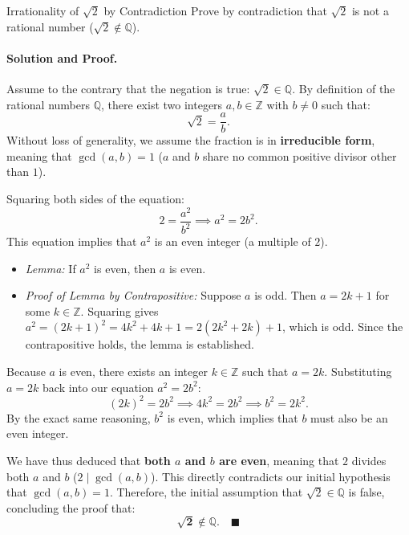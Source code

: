 \begin{workedexample}{Irrationality of $\sqrt{2}$ by Contradiction}
Prove by contradiction that $\sqrt{2}$ is not a rational number ($\sqrt{2} \notin \mathbb{Q}$).

\paragraph{Solution and Proof.}
Assume to the contrary that the negation is true: $\sqrt{2} \in \mathbb{Q}$.
By definition of the rational numbers $\mathbb{Q}$, there exist two integers $a, b \in \mathbb{Z}$ with $b \neq 0$ such that:
\[
\sqrt{2} = \frac{a}{b}.
\]
Without loss of generality, we assume the fraction is in \textbf{irreducible form}, meaning that $\gcd(a, b) = 1$ ($a$ and $b$ share no common positive divisor other than $1$).

Squaring both sides of the equation:
\[
2 = \frac{a^2}{b^2} \implies a^2 = 2 b^2.
\]
This equation implies that $a^2$ is an even integer (a multiple of $2$).
\begin{itemize}[leftmargin=1.4em,itemsep=2pt]
  \item \textit{Lemma:} If $a^2$ is even, then $a$ is even.
  \item \textit{Proof of Lemma by Contrapositive:} Suppose $a$ is odd. Then $a = 2k + 1$ for some $k \in \mathbb{Z}$.
  Squaring gives $a^2 = (2k+1)^2 = 4k^2 + 4k + 1 = 2(2k^2 + 2k) + 1$, which is odd. Since the contrapositive holds, the lemma is established.
\end{itemize}
Because $a$ is even, there exists an integer $k \in \mathbb{Z}$ such that $a = 2k$.
Substituting $a = 2k$ back into our equation $a^2 = 2 b^2$:
\[
(2k)^2 = 2 b^2 \implies 4k^2 = 2 b^2 \implies b^2 = 2k^2.
\]
By the exact same reasoning, $b^2$ is even, which implies that $b$ must also be an even integer.

We have thus deduced that \textbf{both $a$ and $b$ are even}, meaning that $2$ divides both $a$ and $b$ ($2 \mid \gcd(a, b)$).
This directly contradicts our initial hypothesis that $\gcd(a, b) = 1$.
Therefore, the initial assumption that $\sqrt{2} \in \mathbb{Q}$ is false, concluding the proof that:
\[
\mathbf{\sqrt{2} \notin \mathbb{Q}}. \quad \blacksquare
\]
\end{workedexample}

